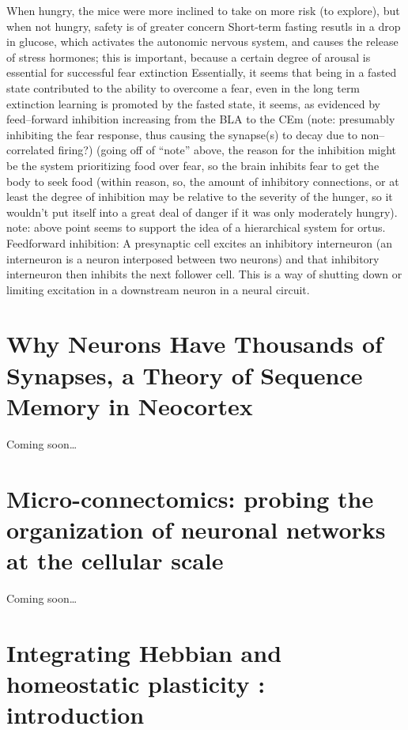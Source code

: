 \documentclass[11pt, a4paper, oneside]{article}   	%
\begin{document}
\begin{outline}
        \subpoint When hungry, the mice were more inclined to take on more risk (to explore), but when not hungry, safety is of greater concern
        \subpoint Short-term fasting resutls in a drop in glucose, which activates the autonomic nervous system, and causes the release of stress hormones; this is important, because a certain degree of arousal is essential for successful fear extinction
           \subsubpoint Essentially, it seems that being in a fasted state contributed to the ability to overcome a fear, even in the long term
           \subsubpoint extinction learning is promoted by the fasted state, it seems, as evidenced by feed--forward inhibition increasing from the BLA to the CEm (note: presumably inhibiting the fear response, thus causing the synapse(s) to decay due to non--correlated firing?)
                \supersubpoint (going off of ``note'' above, the reason for the inhibition might be the system prioritizing food over fear, so the brain inhibits fear to get the body to seek food (within reason, so, the amount of inhibitory connections, or at least the degree of inhibition may be relative to the severity of the hunger, so it wouldn't put itself into a great deal of danger if it was only moderately hungry).
                \supersubpoint note: above point seems to support the idea of a hierarchical system for ortus.
        \subpoint Feedforward inhibition:  A presynaptic cell excites an inhibitory interneuron (an interneuron is a neuron interposed between two neurons) and that inhibitory interneuron then inhibits the next follower cell.  This is a way of shutting down or limiting excitation in a downstream neuron in a neural circuit.


\end{outline}

\section{Why Neurons Have Thousands of Synapses, a Theory of Sequence Memory in Neocortex \cite{Hawkins2016}}

Coming soon\ldots

\section{Micro-connectomics: probing the organization of neuronal networks at the cellular scale \cite{Schroter2017}}

Coming soon\ldots

\section{Integrating Hebbian and homeostatic plasticity : introduction \cite{Fox2017}}
\end{document}
